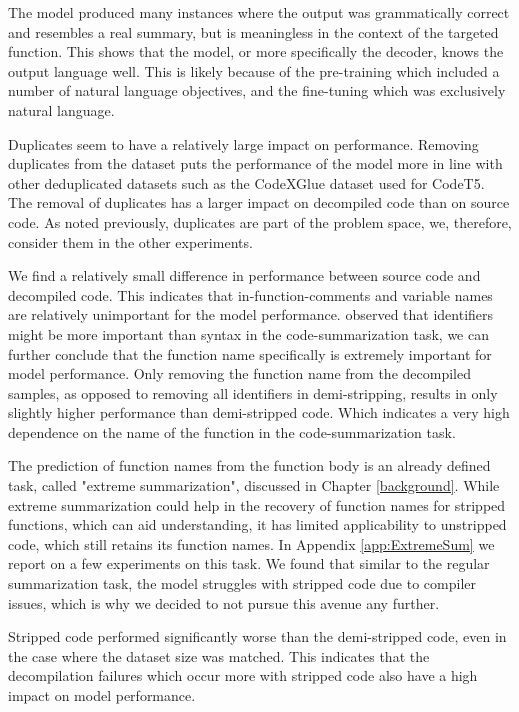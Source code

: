 The model produced many instances where the output was grammatically correct and resembles a real summary, but is meaningless in the context of the targeted function. This shows that the model, or more specifically the decoder, knows the output language well. This is likely because of the pre-training which included a number of natural language objectives, and the fine-tuning which was exclusively natural language.

Duplicates seem to have a relatively large impact on performance. Removing duplicates from the dataset puts the performance of the model more in line with other deduplicated datasets such as the CodeXGlue dataset used for CodeT5. The removal of duplicates has a larger impact on decompiled code than on source code. As noted previously, duplicates are part of the problem space, we, therefore, consider them in the other experiments.

We find a relatively small difference in performance between source code and decompiled code. This indicates that in-function-comments and variable names are relatively unimportant for the model performance. \citeauthor{PolyglotCodeBERT} observed that identifiers might be more important than syntax in the code-summarization task, we can further conclude that the function name specifically is extremely important for model performance. Only removing the function name from the decompiled samples, as opposed to removing all identifiers in demi-stripping, results in only slightly higher performance than demi-stripped code. Which indicates a very high dependence on the name of the function in the code-summarization task. 

The prediction of function names from the function body is an already defined task, called "extreme summarization", discussed in Chapter \ref{background}. While extreme summarization could help in the recovery of function names for stripped functions, which can aid understanding, it has limited applicability to unstripped code, which still retains its function names. In Appendix \ref{app:ExtremeSum} we report on a few experiments on this task. We found that similar to the regular summarization task, the model struggles with stripped code due to compiler issues, which is why we decided to not pursue this avenue any further. 

Stripped code performed significantly worse than the demi-stripped code, even in the case where the dataset size was matched. This indicates that the decompilation failures which occur more with stripped code also have a high impact on model performance.

